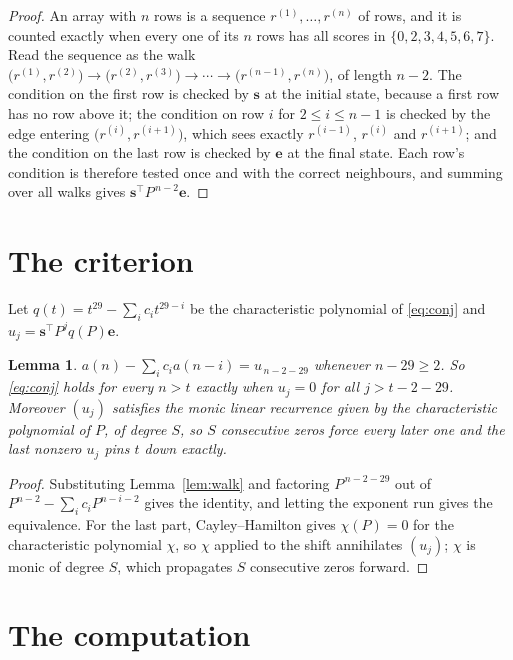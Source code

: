 \documentclass[11pt,a4paper]{article}
\theoremstyle{plain}
\newtheorem{lemma}[theorem]{Lemma}
\theoremstyle{definition}
\begin{document}
\begin{proof}
An array with $n$ rows is a sequence $r^{(1)},\dots,r^{(n)}$ of rows, and it is counted
exactly when every one of its $n$ rows has all scores in $\{0,2,3,4,5,6,7\}$. Read the sequence as the
walk $\bigl(r^{(1)},r^{(2)}\bigr)\to\bigl(r^{(2)},r^{(3)}\bigr)\to\cdots\to
\bigl(r^{(n-1)},r^{(n)}\bigr)$, of length $n-2$. The condition on the first row is
checked by $\mathbf{s}$ at the initial state, because a first row has no row above it; the
condition on row $i$ for $2\le i\le n-1$ is checked by the edge entering
$\bigl(r^{(i)},r^{(i+1)}\bigr)$, which sees exactly $r^{(i-1)}$, $r^{(i)}$ and
$r^{(i+1)}$; and the condition on the last row is checked by $\mathbf{e}$ at the final
state. Each row's condition is therefore tested once and with the correct neighbours, and
summing over all walks gives $\mathbf{s}^{\!\top}P^{\,n-2}\mathbf{e}$.
\end{proof}

\section{The criterion}

Let $q(t)=t^{29}-\sum_i c_i t^{29-i}$ be the characteristic polynomial of
\eqref{eq:conj} and $u_j=\mathbf{s}^{\!\top}P^{j}q(P)\mathbf{e}$.

\begin{lemma}\label{lem:crit}
$a(n)-\sum_i c_i a(n-i)=u_{\,n-2-29}$ whenever $n-29\ge2$. So \eqref{eq:conj}
holds for every $n>t$ exactly when $u_j=0$ for all $j>t-2-29$. Moreover $(u_j)$
satisfies the monic linear recurrence given by the characteristic polynomial of $P$, of
degree $S$, so $S$ consecutive zeros force every later one and the last nonzero $u_j$ pins
$t$ down exactly.
\end{lemma}

\begin{proof}
Substituting Lemma~\ref{lem:walk} and factoring $P^{\,n-2-29}$ out of
$P^{n-2}-\sum_i c_i P^{n-i-2}$ gives the identity, and letting the exponent run gives the
equivalence. For the last part, Cayley--Hamilton gives $\chi(P)=0$ for the characteristic
polynomial $\chi$, so $\chi$ applied to the shift annihilates $(u_j)$; $\chi$ is monic of
degree $S$, which propagates $S$ consecutive zeros forward.
\end{proof}

\section{The computation}
\end{document}
